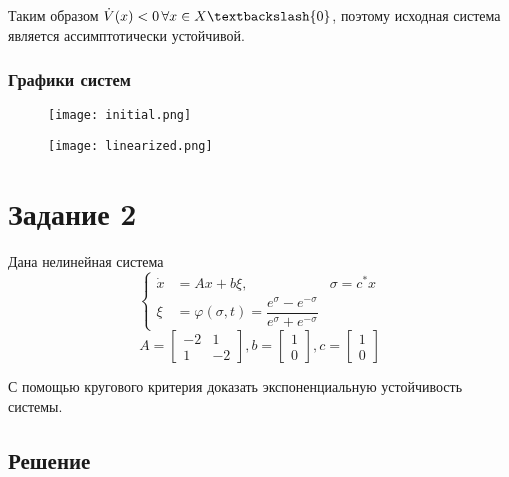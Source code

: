     Таким образом $\dot{V}(x) < 0\, \forall x \in X \textbackslash\{0\}$, поэтому исходная система является
    ассимптотически устойчивой.

    \subsubsection*{Графики систем}

    \begin{figure}[H]
        \centering
        \texttt{[image: initial.png]}
        \caption{}
    \end{figure}

    \begin{figure}[H]
        \centering
        \texttt{[image: linearized.png]}
        \caption{}
    \end{figure}

    \section*{Задание 2}
    Дана нелинейная система
    \begin{equation*}
        \left\{
        \begin{aligned}
            \dot{x} &= Ax + b\xi,& \sigma = c^*x\\
            \xi &= \varphi(\sigma, t)=\dfrac{e^{\sigma} - e^{-\sigma}}{e^{\sigma} + e^{-\sigma}}&
        \end{aligned}
        \right.
    \end{equation*}
    \begin{equation*}
        A =
        \begin{bmatrix}
            -2& 1\\
            1& -2
        \end{bmatrix}
        , b =
        \begin{bmatrix}
            1\\
            0
        \end{bmatrix}
        , c =
        \begin{bmatrix}
            1\\
            0
        \end{bmatrix}
    \end{equation*}

    С помощью кругового критерия доказать экспоненциальную устойчивость системы.

    \subsection*{Решение}
